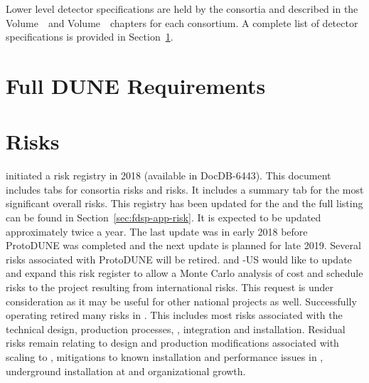 Lower level detector specifications are held by the consortia and
described in the   
Volume~\volnumbersp\ and  Volume~\volnumberdp\ chapters for
each consortium. A complete list of detector specifications is
provided in Section~\ref{sec:fdsp-app-requirements}.

\section{Full DUNE Requirements}
\label{sec:fdsp-app-requirements}



\section{Risks}
\label{sec:fdsp-coord-risks}


 initiated a risk registry in 2018 (available in
DocDB-6443). This document includes tabs for consortia risks and
 risks. It includes a summary tab for the most significant
overall  risks.  This registry has been updated for the
 and the full listing can be found in 
Section~\ref{sec:fdsp-app-risk}. It is expected to be updated
approximately twice a year. The last update was in early 2018 before
ProtoDUNE was completed and the next update is planned for late
2019. Several risks associated with ProtoDUNE will
be retired.  and -US would like  to update and
expand this risk register to allow a Monte Carlo analysis of cost and
schedule risks to the  project resulting from international
 risks. This request is under consideration as it may be
useful for other national projects as well.
Successfully operating  retired many 
risks in . This includes most risks associated with the
technical design, production processes, , integration and
installation. Residual risks remain relating to design and production
modifications associated with scaling to , mitigations to
known installation and performance issues in ,
underground installation at \surf and organizational growth.


